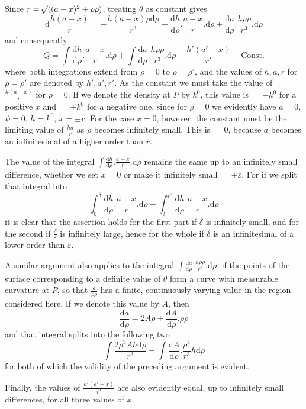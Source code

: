 Since $r=\mathord{{}^{}\!\surd}((a-x)^2+\rho\rho)$, treating $\theta$ as constant gives
\[
\mathrm{d}\frac{h(a-x)}{r}=-\frac{h(a-x)\rho\mathrm{d}\rho}{r^3}+\frac{\mathrm{d}h}{\mathrm{d}\rho}.\frac{a-x}{r}.\mathrm{d}\rho+\frac{\mathrm{d}a}{\mathrm{d}\rho}.\frac{h\rho\rho}{r^3}.\mathrm{d}\rho
\]
and consequently
\[
Q=\int\frac{\mathrm{d}h}{\mathrm{d}\rho}.\frac{a-x}{r}.\mathrm{d}\rho+\int\frac{\mathrm{d}a}{\mathrm{d}\rho}.\frac{h\rho\rho}{r^3}.\mathrm{d}\rho-\frac{h'(a'-x)}{r'}+\text{Const.}
\]
where both integrations extend from $\rho=0$ to $\rho=\rho'$, and the values
%
of $h,a,r$ for $\rho=\rho'$ are denoted by $h',a',r'$. As the constant we must take the value of $\frac{h(a-x)}{r}$ for $\rho=0$. If we denote the density at $P$ by $k^0$, this value is $=-k^0$ for a positive $x$ and $=+k^0$ for a negative one, since for $\rho=0$ we evidently have $a=0$, $\psi=0$, $h=k^0$, $x=\pm r$. For the case $x=0$, however, the constant must be the limiting value of $\frac{ha}{r}$ as $\rho$ becomes infinitely small. This is $=0$, because $a$ becomes an infinitesimal of a higher order than $r$.

The value of the integral $\int\frac{\mathrm dh}{\mathrm d\rho}.\frac{a-x}{r}.\mathrm d\rho$ remains the same up to an infinitely small difference, whether we set $x=0$ or make it infinitely small $=\pm\varepsilon$. For if we split that integral into
\[
\int_0^\delta\frac{\mathrm dh}{\mathrm d\rho}.\frac{a-x}{r}.\mathrm d\rho+\int_\delta^{\rho'}\frac{\mathrm dh}{\mathrm d\rho}.\frac{a-x}{r}.\mathrm d\rho
\]
it is clear that the assertion holds for the first part if $\delta$ is infinitely small, and for the second if $\frac{\delta}{\varepsilon}$ is infinitely large, hence for the whole if $\delta$ is an infinitesimal of a lower order than $\varepsilon$.

A similar argument also applies to the integral $\int\frac{\mathrm da}{\mathrm d\rho}.\frac{h\rho\rho}{r^3}.\mathrm d\rho$, if the points of the surface corresponding to a definite value of $\theta$ form a curve with measurable curvature at $P$, so that $\frac{a}{\rho\rho}$ has a finite, continuously varying value in the region considered here. If we denote this value by $A$, then
\[
\frac{\mathrm da}{\mathrm d\rho}=2A\rho+\frac{\mathrm dA}{\mathrm d\rho}.\rho\rho
\]
and that integral splits into the following two
\[
\int\frac{2\rho^3Ah\mathrm d\rho}{r^3}+\int\frac{\mathrm dA}{\mathrm d\rho}.\frac{\rho^4}{r^3}h\mathrm d\rho
\]
for both of which the validity of the preceding argument is evident.

Finally, the values of $\frac{h'(a'-x)}{r'}$ are also evidently equal, up to infinitely small differences, for all three values of $x$.

